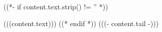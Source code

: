 ((*- if content.text.strip() != '' *))
\par (((content.text)))
((* endif *))
 (((- content.tail -)))


